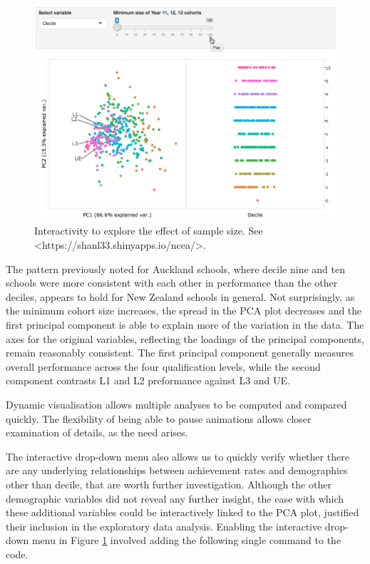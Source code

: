 \documentclass[]{book}
\theoremstyle{definition}
\theoremstyle{definition}
\theoremstyle{definition}
\theoremstyle{remark}
\begin{document}
\begin{figure}[center]
\includegraphics[width=500px]{files/pca_shiny0} \caption{Interactivity to explore the effect of sample size. See <https://shanl33.shinyapps.io/ncea/>.}\label{fig:pcaSize}
\end{figure}

The pattern previously noted for Auckland schools, where decile nine and
ten schools were more consistent with each other in performance than the
other deciles, appears to hold for New Zealand schools in general. Not
surprisingly, as the minimum cohort size increases, the spread in the
PCA plot decreases and the first principal component is able to explain
more of the variation in the data. The axes for the original variables,
reflecting the loadings of the principal components, remain reasonably
consistent. The first principal component generally measures overall
performance across the four qualification levels, while the second
component contrasts L1 and L2 preformance against L3 and UE.

\begin{boxed}
Dynamic visualisation allows multiple analyses to be computed and
compared quickly. The flexibility of being able to pause animations
allows closer examination of details, as the need arises.
\end{boxed}

The interactive drop-down menu also allows us to quickly verify whether
there are any underlying relationships between achievement rates and
demographics other than decile, that are worth further investigation.
Although the other demographic variables did not reveal any further
insight, the ease with which these additional variables could be
interactively linked to the PCA plot, justified their inclusion in the
exploratory data analysis. Enabling the interactive drop-down menu in
Figure \ref{fig:pcaSize} involved adding the following single command to
the code.
\end{document}
